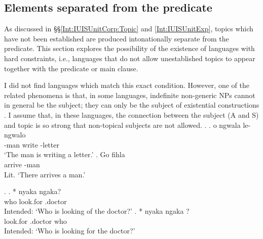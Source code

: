 \subsection{Elements separated from the predicate}\label{Disc:HardConst:Separated}

As discussed in \S\S \ref{Int:IUISUnitCorp:Topic} and \ref{Int:IUISUnitExp},
topics which have not been established are produced intonationally separate from the predicate.
This section explores the possibility of the existence of
languages with hard constraints,
i.e., languages that do not allow unestablished topics to appear together with the predicate or main clause.

I did not find languages which match this exact condition.
However, one of the related phenomena is that, in some languages,
indefinite non-generic NPs cannot in general be the subject;
they can only be the subject of existential constructions \cite[173ff.]{givon76}.
I assume that, in these languages,
the connection between the subject (A and S) and topic is so strong
that non-topical subjects are not allowed.
%
\ex.
 \ag.  o ngwala le-ngwalo \\
      -man  write -letter \\
      `The man is writing a letter.'
 \bg. Go fihla  \\
       arrive -man \\
      Lit. `There arrives a man.'
     \hfill{\cite[171]{zerbian06}}

%
\ex.
 \ag. *  nyaka ngaka? \\
       who  look.for .doctor \\
       Intended: `Who is looking of the doctor?'
 \bg. * nyaka ngaka ? \\
        look.for .doctor who \\
       Intended: `Who is looking for the doctor?'
     \hfill{\cite[69]{zerbian06}}

